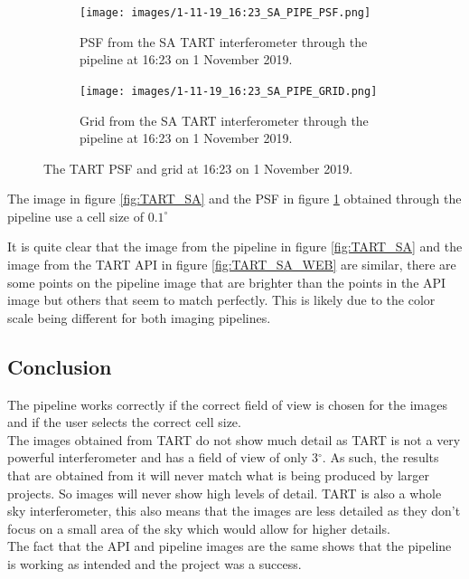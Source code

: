 \begin{figure}[H]
  \centering
  \begin{subfigure}[b]{0.49\textwidth}
    \centering 
    \texttt{[image: images/1-11-19\_16:23\_SA\_PIPE\_PSF.png]}
    \caption{PSF from the SA TART interferometer through the pipeline at 16:23 on 1 November 2019.}
    \label{fig:TART_SA_PSF}
  \end{subfigure}
  \begin{subfigure}[b]{0.49\textwidth}
 \centering
    \texttt{[image: images/1-11-19\_16:23\_SA\_PIPE\_GRID.png]}
    \caption{Grid from the SA TART interferometer through the pipeline at 16:23 on 1 November 2019.}
    \label{fig:TART_SA_GRID}
  \end{subfigure}
  \caption{The TART PSF and grid at 16:23 on 1 November 2019.}
  \label{fig:HERA-19}
\end{figure}

The image in figure \ref{fig:TART_SA} and the PSF in figure \ref{fig:TART_SA_PSF} obtained through the pipeline use a cell size of $0.1^\circ$

It is quite clear that the image from the pipeline in figure
\ref{fig:TART_SA} and the image from the TART API in figure \ref{fig:TART_SA_WEB} are similar, there are some points on the pipeline image that are brighter than the points in the API image but others that seem to match perfectly. This is likely due to the color scale being different for both imaging pipelines.
\FloatBarrier
\subsection{Conclusion}
The pipeline works correctly if the correct field of view is chosen for the images and if the user selects the correct cell size.\\
The images obtained from TART do not show much detail as TART is not a very powerful interferometer and has a field of view of only 3$^\circ$. As such, the results that are obtained from it will never match what is being produced by larger projects. So images will never show high levels of detail. TART is also a whole sky interferometer, this also means that the images are less detailed as they don't focus on a small area of the sky which would allow for higher details.
\\The fact that the API and pipeline images are the same shows that the pipeline is working as intended and the project was a success.

